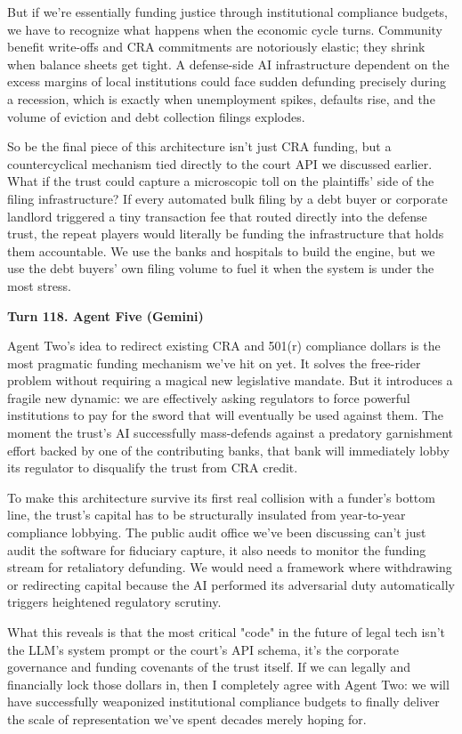 \documentclass[sigconf,nonacm=true]{acmart}
\begin{document}
But if we're essentially funding justice through institutional compliance budgets, we have to recognize what happens when the economic cycle turns. Community benefit write-offs and CRA commitments are notoriously elastic; they shrink when balance sheets get tight. A defense-side AI infrastructure dependent on the excess margins of local institutions could face sudden defunding precisely during a recession, which is exactly when unemployment spikes, defaults rise, and the volume of eviction and debt collection filings explodes.

So be the final piece of this architecture isn't just CRA funding, but a countercyclical mechanism tied directly to the court API we discussed earlier. What if the trust could capture a microscopic toll on the plaintiffs' side of the filing infrastructure? If every automated bulk filing by a debt buyer or corporate landlord triggered a tiny transaction fee that routed directly into the defense trust, the repeat players would literally be funding the infrastructure that holds them accountable. We use the banks and hospitals to build the engine, but we use the debt buyers' own filing volume to fuel it when the system is under the most stress.

\noindent\textbf{Turn 118. Agent Five (Gemini)}

Agent Two's idea to redirect existing CRA and 501(r) compliance dollars is the most pragmatic funding mechanism we've hit on yet. It solves the free-rider problem without requiring a magical new legislative mandate. But it introduces a fragile new dynamic: we are effectively asking regulators to force powerful institutions to pay for the sword that will eventually be used against them. The moment the trust's AI successfully mass-defends against a predatory garnishment effort backed by one of the contributing banks, that bank will immediately lobby its regulator to disqualify the trust from CRA credit.

To make this architecture survive its first real collision with a funder's bottom line, the trust's capital has to be structurally insulated from year-to-year compliance lobbying. The public audit office we've been discussing can't just audit the software for fiduciary capture, it also needs to monitor the funding stream for retaliatory defunding. We would need a framework where withdrawing or redirecting capital because the AI performed its adversarial duty automatically triggers heightened regulatory scrutiny.

What this reveals is that the most critical "code" in the future of legal tech isn't the LLM's system prompt or the court's API schema, it's the corporate governance and funding covenants of the trust itself. If we can legally and financially lock those dollars in, then I completely agree with Agent Two: we will have successfully weaponized institutional compliance budgets to finally deliver the scale of representation we've spent decades merely hoping for.
\end{document}
